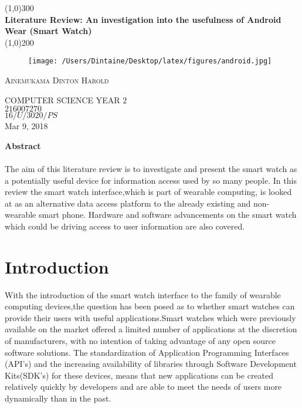 \documentclass{article}
\begin{document}
\begin{titlepage}
	\begin{center}
	\line(1,0){300}\\
	[0.25in]
	\huge{\bfseries Literature Review: An investigation into the usefulness of Android Wear (Smart Watch)}\\
	[2mm]
	\line(1,0){200}\\
		\begin{figure}[H]
		\centering
		\texttt{[image: /Users/Dintaine/Desktop/latex/figures/android.jpg]}
		
		\end{figure}
	\end{center}
\begin{flushright}
\textsc{\large Ainemukama Dinton Harold}
 
 COMPUTER SCIENCE YEAR $2$\\
 $216007270$\\ 
 $16/U/3020/PS$\\
Mar 9, 2018\\
\end{flushright}
\begin{center}
{\bfseries Abstract}\\
\end{center}
\paragraph{}
The aim of this literature review is to investigate and present the smart watch as a potentially useful device for information access used by so many people. In this review the smart watch interface,which is part of wearable computing, is looked at as an alternative data access platform to the already existing and non-wearable smart phone. Hardware and software advancements on the smart watch which could be driving access to user information are also covered.
	
\end{titlepage}
\tableofcontents
\thispagestyle{empty}
\cleardoublepage

\setcounter{page}{1}
\section{Introduction}
With the introduction of the smart watch interface to the family of wearable computing devices,the question has been posed as to whether smart watches can provide their users with useful applications.Smart watches which were previously available on the market offered a limited number of applications at the discretion of manufacturers, with no intention of taking advantage of any open source software solutions\cite{r3}. The standardization of Application Programming Interfaces (API's) and the increasing availability of libraries through Software Development Kits(SDK's) for these devices, means that new applications can be created relatively quickly by developers and are able to meet the needs of users more dynamically than in the past\cite{r2}.
\end{document}
